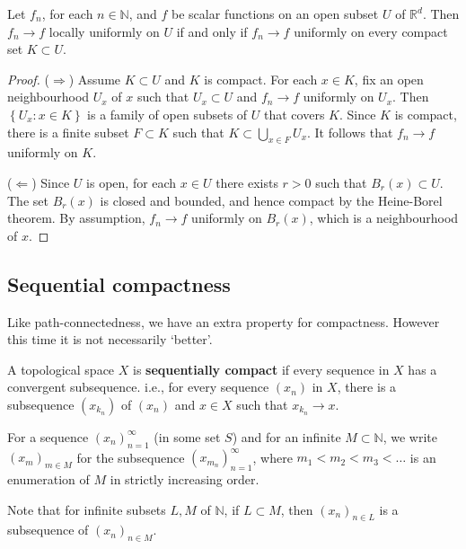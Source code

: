 \documentclass[a4paper,11pt]{article}
\begin{document}
\begin{remark}
    Let $f_{n}$, for each $n \in \mathbb{N}$, and $f$ be scalar functions on an open subset $U$ of $\mathbb{R}^{d}$. Then $f_{n} \rightarrow f$ locally uniformly on $U$ if and only if $f_{n} \rightarrow f$ uniformly on every compact set $K \subset U$.
\end{remark}
\begin{proof}
($\Longrightarrow $) Assume $K \subset U$ and $K$ is compact. For each $x\in K$, fix an open neighbourhood $U_{x}$ of $x$ such that $U_{x} \subset U$ and $f_{n} \rightarrow f$ uniformly on $U_{x}$. Then $\left\{U_{x}: x \in K\right\}$ is a family of open subsets of $U$ that covers $K$. Since $K$ is compact, there is a finite subset $F \subset K$ such that $K \subset \bigcup_{x \in F} U_{x}$. It follows that $f_{n} \rightarrow f$ uniformly on $K$. 

($\Longleftarrow$) Since $U$ is open, for each $x \in U$ there exists $r>0$ such that $B_{r}(x) \subset U$. The set $B_{r}(x)$ is closed and bounded, and hence compact by the Heine-Borel theorem. By assumption, $f_{n} \rightarrow f$ uniformly on $B_{r}(x)$, which is a neighbourhood of $x$.
\end{proof}

\subsection{Sequential compactness}
Like path-connectedness, we have an extra property for compactness. However this time it is not necessarily `better'.
\begin{definition}
    A topological space $X$ is \textbf{sequentially compact} if every sequence in $X$ has a convergent subsequence. i.e., for every sequence $\left(x_{n}\right)$ in $X$, there is a subsequence $\left(x_{k_{n}}\right)$ of $\left(x_{n}\right)$ and $x \in X$ such that $x_{k_{n}} \rightarrow x$.
\end{definition}

For a sequence $\left(x_{n}\right)_{n=1}^{\infty}$ (in some set $S$) and for an infinite $M \subset \mathbb{N}$, we write $\left(x_{m}\right)_{m \in M}$ for the subsequence $\left(x_{m_{n}}\right)_{n=1}^{\infty}$, where $m_{1}<m_{2}<m_{3}<\ldots$ is an enumeration of $M$ in strictly increasing order.

Note that for infinite subsets $L, M$ of $\mathbb{N}$, if $L \subset M$, then $\left(x_{n}\right)_{n \in L}$ is a subsequence of $\left(x_{n}\right)_{n \in M}$.
\end{document}

